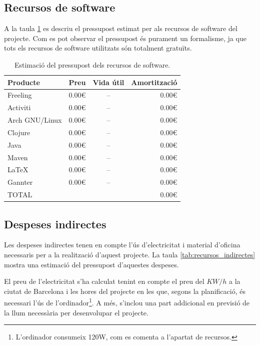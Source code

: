 \subsection{Recursos de software}

A la taula \ref{tab:recursos_software} es descriu el pressupost estimat per als recursos de software del projecte. Com es pot observar el pressupost és purament un formalisme, ja que tots els recursos de software utilitzats són totalment gratuïts.

\begin{table}[!htb]
    \centering
    \begin{tabular}{|l||c|c|r|}
        \hline
         Producte & Preu & Vida útil & Amortització \\
         \hline\hline
         Freeling & 0.00€ & -- & 0.00€ \\
         Activiti & 0.00€ & -- & 0.00€ \\
         Arch GNU/Linux & 0.00€ & -- & 0.00€ \\
         Clojure & 0.00€ & -- & 0.00€ \\
         Java & 0.00€ & -- & 0.00€ \\
         Maven & 0.00€ & -- & 0.00€ \\
         \LaTeX & 0.00€ & -- & 0.00€ \\
         Gannter & 0.00€ & -- & 0.00€ \\
         \hline\hline
         TOTAL & & & 0.00€ \\
         \hline
    \end{tabular}
    \caption{Estimació del pressupost dels recursos de software.}
    \label{tab:recursos_software}
\end{table}


\subsection{Despeses indirectes}

Les despeses indirectes tenen en compte l'ús d'electricitat i material d'oficina necessaris per a la realització d'aquest projecte. La taula \ref{tab:recursos_indirectes} mostra una estimació del pressupost d'aquestes despeses.

El preu de l'electricitat s'ha calculat tenint en compte el preu del $KW/h$ a la ciutat de Barcelona i les hores del projecte en les que, segons la planificació, és necessari l'ús de l'ordinador\footnote{L'ordinador consumeix 120W, com es comenta a l'apartat de recursos.}. A més, s'inclou una part addicional en previsió de la llum necessària per desenvolupar el projecte.


